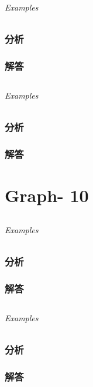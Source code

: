 \documentclass[UTF8,a4paper,12pt]{ctexbook}
\begin{document}
	\subparagraph{Examples}
	
	\subsection{分析}
	
	\subsection{解答}
	
\section{}
	
	\subparagraph{Examples}
	
	\subsection{分析}
	
	\subsection{解答}
\chapter{Graph- 10}
\section{}
	
	\subparagraph{Examples}
	
	\subsection{分析}
	
	\subsection{解答}
	
\section{}
	
	\subparagraph{Examples}
	
	\subsection{分析}
	
	\subsection{解答}
	
\end{document}
